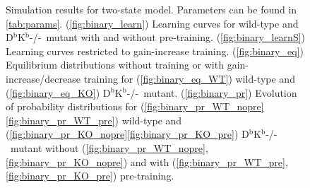 \documentclass[12pt]{article}
\newcommand{\KO}{D$^\mathrm{b}$K$^\mathrm{b}$-/-}
\begin{document}
\begin{figure}
 \begin{center}
 \begin{myenuma}
  \item{}\label{fig:binary_learn}
  \item{}\label{fig:binary_learnS}
  \item\label{fig:binary_eq}\begin{myenumi}
                    \item{}\label{fig:binary_eq_WT}
                    \item{}\label{fig:binary_eq_KO}
                  \end{myenumi}
  \item\label{fig:binary_pr}\begin{myenumi}
                    \item{}\label{fig:binary_pr_WT_nopre}
                    \item{}\label{fig:binary_pr_WT_pre}
                    \item{}\label{fig:binary_pr_KO_nopre}
                    \item{}\label{fig:binary_pr_KO_pre}
                  \end{myenumi}
 \end{myenuma}
 \end{center}
  \caption{Simulation results for two-state model.
  Parameters can be found in \autoref{tab:params}.
  (\ref{fig:binary_learn}) Learning curves for wild-type and \KO\ mutant with and without pre-training.
  (\ref{fig:binary_learnS}) Learning curves restricted to gain-increase training.
  (\ref{fig:binary_eq}) Equilibrium distributions without training or with gain-increase/decrease training for (\ref{fig:binary_eq_WT}) wild-type and (\ref{fig:binary_eq_KO}) \KO\ mutant.
  (\ref{fig:binary_pr}) Evolution of probability distributions for (\ref{fig:binary_pr_WT_nopre}\ref{fig:binary_pr_WT_pre}) wild-type and  (\ref{fig:binary_pr_KO_nopre}\ref{fig:binary_pr_KO_pre}) \KO\ mutant without (\ref{fig:binary_pr_WT_nopre},\ref{fig:binary_pr_KO_nopre}) and with (\ref{fig:binary_pr_WT_pre},\ref{fig:binary_pr_KO_pre}) pre-training. } \label{fig:binary_res}
\end{figure}
\end{document}
